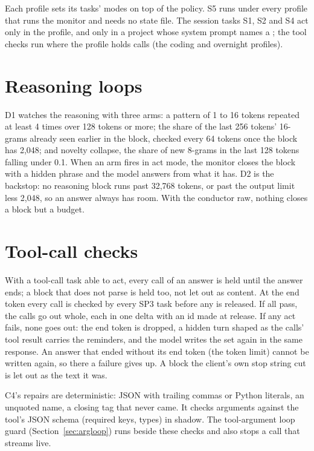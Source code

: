 Each profile sets its tasks' modes on top of the policy. S5 runs under every profile that runs the monitor and needs no state file. The session tasks S1, S2 and S4 act only in the  profile, and only in a project whose system prompt names a ; the tool checks run where the profile holds calls (the coding and overnight profiles).

\section{Reasoning loops}

D1 watches the reasoning with three arms: a pattern of 1 to 16 tokens repeated at least 4 times over 128 tokens or more; the share of the last 256 tokens' 16-grams already seen earlier in the block, checked every 64 tokens once the block has 2,048; and novelty collapse, the share of new 8-grams in the last 128 tokens falling under 0.1. When an arm fires in act mode, the monitor closes the block with a hidden phrase and the model answers from what it has. D2 is the backstop: no reasoning block runs past 32,768 tokens, or past the output limit less 2,048, so an answer always has room. With the conductor raw, nothing closes a block but a budget.

\section{Tool-call checks}

With a tool-call task able to act, every call of an answer is held until the answer ends; a block that does not parse is held too, not let out as content. At the end token every call is checked by every SP3 task before any is released. If all pass, the calls go out whole, each in one delta with an id made at release. If any act fails, none goes out: the end token is dropped, a hidden turn shaped as the calls' tool result carries the reminders, and the model writes the set again in the same response. An answer that ended without its end token (the token limit) cannot be written again, so there a failure gives up. A block the client's own stop string cut is let out as the text it was.

C4's repairs are deterministic: JSON with trailing commas or Python literals, an unquoted name, a closing tag that never came. It checks arguments against the tool's JSON schema (required keys, types) in shadow. The tool-argument loop guard (Section~\ref{sec:argloop}) runs beside these checks and also stops a call that streams live.


